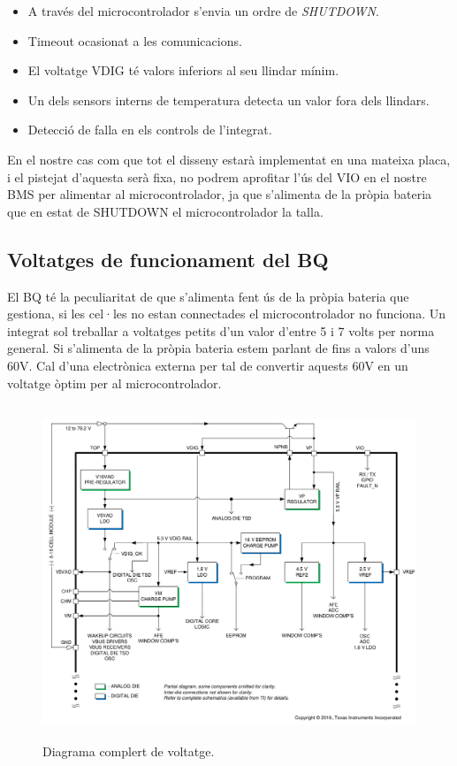 \begin{itemize}
    \item A través del microcontrolador s'envia un ordre de \textit{SHUTDOWN}.
    \item Timeout ocasionat a les comunicacions.
    \item El voltatge VDIG té valors inferiors al seu llindar mínim.
    \item Un dels sensors interns de temperatura detecta un valor fora dels llindars.
    \item Detecció de falla en els controls de l'integrat.
\end{itemize}

En el nostre cas com que tot el disseny estarà implementat en una mateixa placa, i el pistejat d'aquesta serà fixa, no podrem aprofitar l'ús del VIO en el nostre BMS per alimentar al microcontrolador, ja que s'alimenta de la pròpia bateria que en estat de SHUTDOWN el microcontrolador la talla. 

\subsection{Voltatges de funcionament del BQ}

El BQ té la peculiaritat de que s'alimenta fent ús de la pròpia bateria que gestiona, si les cel·les no estan connectades el microcontrolador no funciona. Un integrat sol treballar a voltatges petits d'un valor d'entre 5 i 7 volts per norma general. Si s'alimenta de la pròpia bateria estem parlant de fins a valors d'uns 60V. Cal d'una electrònica externa per tal de convertir aquests 60V en un voltatge òptim per al microcontrolador. 

\begin{figure}[H]
	\centering
    \includegraphics[width=\textwidth, height=10cm] {Prototip/diagramavoltaje.png}
    \caption{Diagrama complert de voltatge.}
\end{figure}

